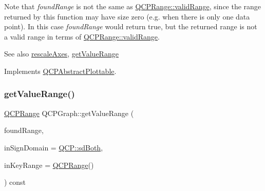 Note that {\itshape found\+Range} is not the same as \hyperlink{class_q_c_p_range_ab38bd4841c77c7bb86c9eea0f142dcc0}{Q\+C\+P\+Range\+::valid\+Range}, since the range returned by this function may have size zero (e.\+g. when there is only one data point). In this case {\itshape found\+Range} would return true, but the returned range is not a valid range in terms of \hyperlink{class_q_c_p_range_ab38bd4841c77c7bb86c9eea0f142dcc0}{Q\+C\+P\+Range\+::valid\+Range}.

\begin{DoxySeeAlso}{See also}
\hyperlink{class_q_c_p_abstract_plottable_a1491c4a606bccd2d09e65e11b79eb882}{rescale\+Axes}, \hyperlink{class_q_c_p_graph_a8f773e56f191a61c06e129e90a604d77}{get\+Value\+Range} 
\end{DoxySeeAlso}


Implements \hyperlink{class_q_c_p_abstract_plottable_a4da16d3cd4b509e1104a9b0275623c96}{Q\+C\+P\+Abstract\+Plottable}.

\mbox{\label{class_q_c_p_graph_a8f773e56f191a61c06e129e90a604d77}} 
\subsubsection{\texorpdfstring{get\+Value\+Range()}{getValueRange()}}
{\footnotesize\ttfamily \hyperlink{class_q_c_p_range}{Q\+C\+P\+Range} Q\+C\+P\+Graph\+::get\+Value\+Range (\begin{DoxyParamCaption}\item[{bool \&}]{found\+Range,  }\item[{\hyperlink{namespace_q_c_p_afd50e7cf431af385614987d8553ff8a9}{Q\+C\+P\+::\+Sign\+Domain}}]{in\+Sign\+Domain = {\ttfamily \hyperlink{namespace_q_c_p_afd50e7cf431af385614987d8553ff8a9aa38352ef02d51ddfa4399d9551566e24}{Q\+C\+P\+::sd\+Both}},  }\item[{const \hyperlink{class_q_c_p_range}{Q\+C\+P\+Range} \&}]{in\+Key\+Range = {\ttfamily \hyperlink{class_q_c_p_range}{Q\+C\+P\+Range}()} }\end{DoxyParamCaption}) const\hspace{0.3cm}{\ttfamily [virtual]}}

